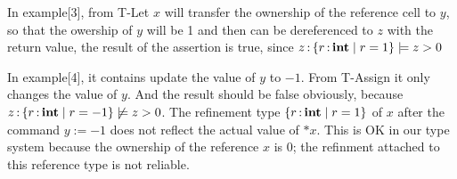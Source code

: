 \documentclass[runningheads]{llncs}
\begin{document}
In example[3], from T-Let $x$ will transfer the ownership of the reference cell to $y$, so that the
owership of $y$ will be 1 and then can be dereferenced to $z$ with the return value, the result of
the assertion is true, since $z \operatorname{:} \left\{{r \operatorname{:} \mathbf{int} \mid r = 1}\right\} \models z>0$

\begin{parcolumns}{2}
\colplacechunks
\end{parcolumns}

In example[4], it contains update the value of $y$ to $-1$. From T-Assign it only changes the value of $y$.
And the result should be false obviously, because $z \operatorname{:} \left\{{r \operatorname{:} \mathbf{int} \mid r = -1}\right\} \not\models z>0$.
The refinement type $\left\{{r \operatorname{:} \mathbf{int} \mid r = 1}\right\}$ of $x$ after the command $y := -1$ does not reflect the actual value of $*x$.
This is OK in our type system because the ownership of the reference $x$ is $0$; the refinment attached to this reference type is not reliable.

\begin{parcolumns}{2}
\colplacechunks
\end{parcolumns}
\end{document}
